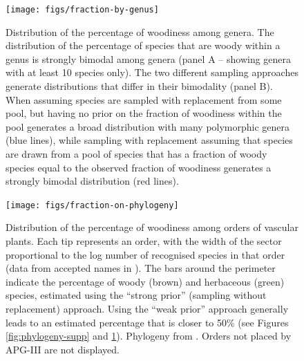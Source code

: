 \documentclass[a4paper,12pt]{article}
\begin{document}
\begin{figure}[p]
  \centering
  \texttt{[image: figs/fraction-by-genus]}
  \caption{Distribution of the percentage of woodiness among genera.
    The distribution of the percentage of species that are woody within
    a genus is strongly bimodal among genera (panel A -- showing
    genera with at least 10 species only).
    The two different sampling approaches generate distributions that
    differ in their bimodality (panel B). When assuming species are
    sampled with replacement from some pool, but having no prior on
    the fraction of woodiness within the pool generates a broad
    distribution with many polymorphic genera (blue lines), while
    sampling with replacement assuming that species are drawn from a
    pool of species that has a fraction of woody species equal to the
    observed fraction of woodiness generates a strongly bimodal
    distribution (red lines).}
  \label{fig:distribution-genera}
\end{figure}

\begin{figure}[p]
  \centering
  \texttt{[image: figs/fraction-on-phylogeny]}
  \caption{Distribution of the percentage of woodiness among orders of
    vascular plants.  Each tip represents an order, with the width of
    the sector proportional to the log number of recognised species in
    that order (data from accepted names in \citet{ThePlantList}).
    The bars around the perimeter indicate the percentage of woody
    (brown) and herbaceous (green) species, estimated using the
    ``strong prior'' (sampling without replacement) approach.  Using
    the ``weak prior'' approach generally leads to an estimated
    percentage that is closer to 50\% (see Figures
    \ref{fig:phylogeny-supp} and \ref{fig:distribution-genera}).
    Phylogeny from \citep{Zanne}.  Orders not placed by APG-III
    \citep{APG3} are not displayed.}
\label{fig:phylogeny}
\end{figure}

\clearpage
\renewcommand\thefigure{S.\arabic{figure}}
\renewcommand\thetable{S.\arabic{table}}
\setcounter{figure}{0}    
\setcounter{table}{0}    
\end{document}
